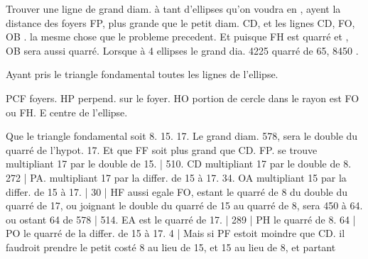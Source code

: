 \documentclass[11pt,a4paper]{article}
\begin{document}
Trouver une ligne   de grand diam. à tant d'ellipses qu'on voudra en ,   ayent la distance des foyers FP, plus grande que le petit diam. CD, et les lignes CD, FO, OB .  \ill{} la mesme chose que le probleme precedent. Et puisque FH est quarré et , OB sera aussi quarré. Lorsque  à 4 ellipses  le grand dia.  4225 quarré de 65,  8450 .


Ayant pris le triangle fondamental  toutes les lignes  de l'ellipse.

PCF foyers. HP perpend. sur le foyer. HO portion de cercle dans le rayon est FO ou FH. E centre de l'ellipse.

Que le triangle fondamental soit 8. 15. 17. Le grand diam. 578, sera le double  du quarré de l'hypot. 17. Et que FF soit plus grand que CD. FP. se trouve multipliant 17 par le double de 15. | 510. CD multipliant 17 par le double de 8. 272 | PA. multipliant 17 par la differ. de 15 à 17. 34. OA multipliant 15 par la differ. de 15 à 17. | 30 | HF aussi egale FO, estant le quarré de 8 du double du quarré de 17, ou joignant le double du quarré de 15 au quarré de 8, sera 450 à 64. ou ostant 64 de 578 | 514. EA est le quarré de 17. | 289 | PH le quarré de 8. 64 | PO le quarré de la differ. de 15 à 17. 4 | Mais si PF estoit moindre que CD. il faudroit prendre le petit costé 8 au lieu de 15, et 15 au lieu de 8, et partant
\end{document}

